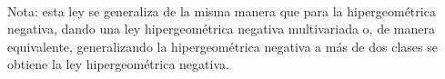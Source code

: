 


\

Nota: esta  ley se  generaliza de  la misma manera  que para  la hipergeom\'etrica
negativa,  dando una  ley  hipergeom\'etrica negativa  multivariada  o, de  manera
equivalente, generalizando la hipergeom\'etrica negativa  a m\'as de dos clases se
obtiene la ley hipergeom\'etrica negativa. 
